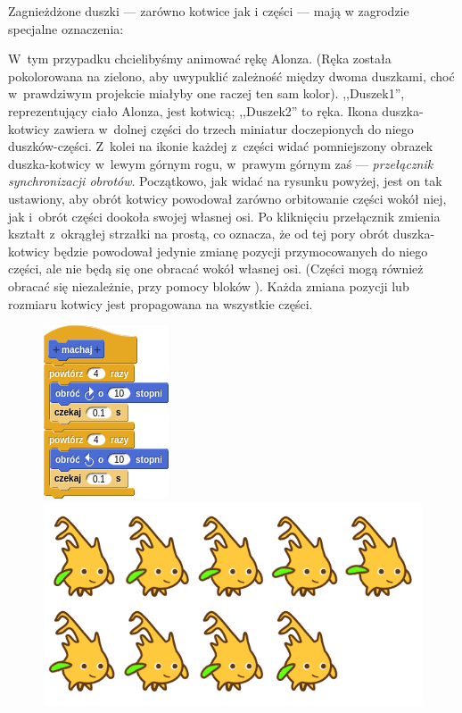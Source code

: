 \documentclass[a4paper]{report}
\begin{document}
Zagnieżdżone duszki --- zarówno kotwice jak i części --- mają w zagrodzie specjalne oznaczenia:\nopagebreak


W~tym przypadku chcielibyśmy animować rękę Alonza. (Ręka została pokolorowana na zielono, aby uwypuklić zależność między dwoma duszkami, choć w~prawdziwym projekcie miałyby one raczej ten sam kolor). ,,Duszek1'', reprezentujący ciało Alonza, jest kotwicą; ,,Duszek2'' to ręka. Ikona duszka-kotwicy zawiera w~dolnej części do trzech miniatur doczepionych do niego duszków-części. Z~kolei na ikonie każdej z~części widać pomniejszony obrazek duszka-kotwicy w~lewym górnym rogu, w~prawym górnym zaś --- \emph{przełącznik synchronizacji obrotów}. Początkowo, jak widać na rysunku powyżej, jest on tak ustawiony, aby obrót kotwicy powodował zarówno orbitowanie części wokół niej, jak i~obrót części dookoła swojej własnej osi. Po kliknięciu przełącznik zmienia kształt z~okrągłej strzałki na prostą, co oznacza, że od tej pory obrót duszka-kotwicy będzie powodował jedynie zmianę pozycji przymocowanych do niego części, ale nie będą się one obracać wokół własnej osi. (Części mogą również obracać się niezależnie, przy pomocy bloków ). Każda zmiana pozycji lub rozmiaru kotwicy jest propagowana na wszystkie części.

\begin{figure}[H]
\centering
\includegraphics[scale=\defaultGraphicsScale]{komenda-machania-reka}%
\hspace{2em}%
\includegraphics[scale=0.4]{../common/alonzo-waving}
\end{figure}
\end{document}
